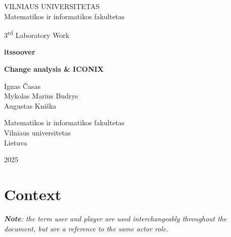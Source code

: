 \documentclass[11pt,a4paper]{article}
\begin{document}

\begin{titlepage}
    \centering
    \thispagestyle{empty}
    
    {\Large VILNIAUS UNIVERSITETAS\\
    Matematikos ir informatikos fakultetas}\par
    
    \vspace{3cm} %
    
    {\Large 3\textsuperscript{rd} Laboratory Work}\par
    \vspace{0.5cm}
    {\Large \textbf{itssoover}}\par
    {\Large \textbf{Change analysis \& ICONIX}}\par
    
    \vspace{3cm}
    
    {\large
    Ignas Časas\\
    Mykolas Marius Budrys\\
    Augustas Kniška
    }\par
    
    \vspace{8cm}
    
    {\large
    Matematikos ir informatikos fakultetas\\
    Vilniaus universitetas\\
    Lietuva
    }\par
    \vfill

    \large 2025
    
\end{titlepage}

\tableofcontents
\newpage


\section{Context}

\textit{\textbf{Note}: the term user and player are used interchangeably throughout the document, but are a reference to the same actor role.}
\end{document}
